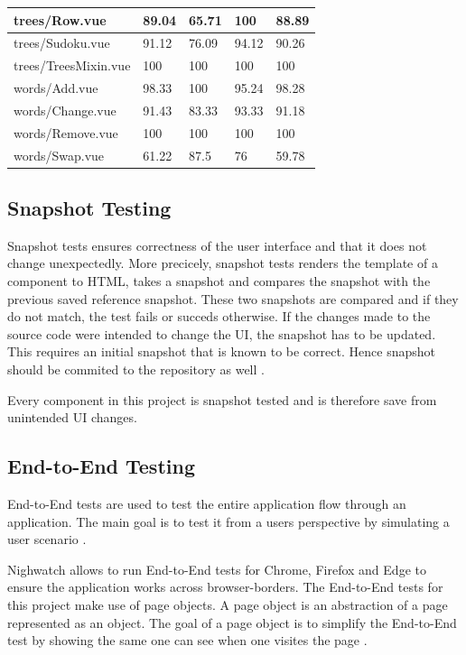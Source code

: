 \begin{table}
\begin{tabular}{|l|l|l|l|l|}
        trees/Row.vue & 89.04 & 65.71 & 100 & 88.89 \\ \hline
        trees/Sudoku.vue & 91.12 & 76.09 & 94.12 & 90.26 \\ \hline
        trees/TreesMixin.vue & 100 & 100 & 100 & 100 \\ \hline
        words/Add.vue & 98.33 & 100 & 95.24 & 98.28 \\ \hline
        words/Change.vue & 91.43 & 83.33 & 93.33 & 91.18 \\ \hline
        words/Remove.vue & 100 & 100 & 100 & 100 \\ \hline
        words/Swap.vue & 61.22 & 87.5 & 76 & 59.78 \\ \hline
    \end{tabular}
\end{table}

\subsection{Snapshot Testing}
\label{subsection:snapshotTesting}
Snapshot tests ensures correctness of the user interface and that it does not change unexpectedly. More precicely, snapshot tests renders the template of a component to HTML, takes a snapshot and compares the snapshot with the previous saved reference snapshot. These two snapshots are compared and if they do not match, the test fails or succeds otherwise. If the changes made to the source code were intended to change the UI, the snapshot has to be updated. This requires an initial snapshot that is known to be correct. Hence snapshot should be commited to the repository as well \cite{Jest}.

Every component in this project is snapshot tested and is therefore save from unintended UI changes.

\subsection{End-to-End Testing}
\label{subsection:e2e}
End-to-End tests are used to test the entire application flow through an application. The main goal is to test it from a users perspective by simulating a user scenario \cite{EndToEndTests}. 

Nighwatch allows to run End-to-End tests for Chrome, Firefox and Edge to ensure the application works across browser-borders. The End-to-End tests for this project make use of page objects. A page object is an abstraction of a page represented as an object. The goal of a page object is to simplify the End-to-End test by showing the same one can see when one visites the page \cite{Nightwatch}.


